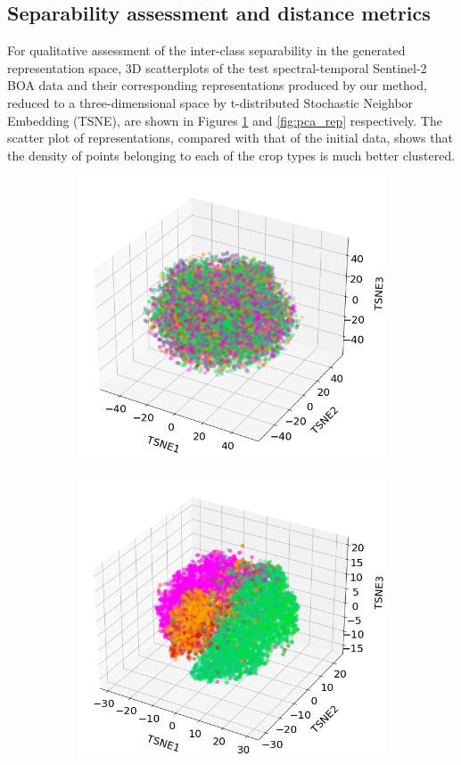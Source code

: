 \documentclass[journal,article,submit,pdftex,moreauthors]{Definitions/mdpi}
\begin{document}
\subsection{Separability assessment and distance metrics}
For qualitative assessment of the inter-class separability in the generated representation space, 3D scatterplots of the test spectral-temporal Sentinel-2 \ac{BOA} data and their corresponding representations produced by our method, reduced to a three-dimensional space by t-distributed Stochastic Neighbor Embedding (TSNE), are shown in Figures \ref{fig:pca_raw} and \ref{fig:pca_rep} respectively.
The scatter plot of representations, compared with that of the initial data, shows that the density of points belonging to each of the crop types is much better clustered.
\begin{figure}[H]
	\centering
	\begin{subfigure}[t]{0.35\linewidth}
		\centering
		\includegraphics[width=0.9\linewidth]{figures/aes_1_layer_mse_results/s2_TSNE_v3.png}
		\caption{}
	  \label{fig:pca_raw}
	\end{subfigure}
	\begin{subfigure}[t]{0.35\linewidth}
		\centering
		\includegraphics[width=0.9\linewidth]{figures/aes_1_layer_mse_results/representations_TSNE_v5.png}

\end{subfigure}
\end{figure}
\end{document}
